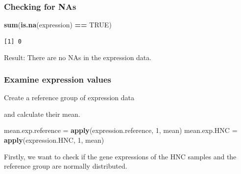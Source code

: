 \documentclass[]{article}
\newenvironment{Shaded}{\begin{snugshade}}{\end{snugshade}}
\newcommand{\KeywordTok}[1]{\textcolor[rgb]{0.13,0.29,0.53}{\textbf{#1}}}
\newcommand{\DecValTok}[1]{\textcolor[rgb]{0.00,0.00,0.81}{#1}}
\newcommand{\StringTok}[1]{\textcolor[rgb]{0.31,0.60,0.02}{#1}}
\newcommand{\CommentTok}[1]{\textcolor[rgb]{0.56,0.35,0.01}{\textit{#1}}}
\newcommand{\OtherTok}[1]{\textcolor[rgb]{0.56,0.35,0.01}{#1}}
\newcommand{\ControlFlowTok}[1]{\textcolor[rgb]{0.13,0.29,0.53}{\textbf{#1}}}
\newcommand{\OperatorTok}[1]{\textcolor[rgb]{0.81,0.36,0.00}{\textbf{#1}}}
\newcommand{\NormalTok}[1]{#1}
\begin{document}
\subsubsection{Checking for NAs}\label{checking-for-nas}

\begin{Shaded}
\begin{Highlighting}[]
\KeywordTok{sum}\NormalTok{(}\KeywordTok{is.na}\NormalTok{(expression) }\OperatorTok{==}\StringTok{ }\OtherTok{TRUE}\NormalTok{)}
\end{Highlighting}
\end{Shaded}

\begin{verbatim}
[1] 0
\end{verbatim}

Result: There are no NAs in the expression data.

\subsubsection{Examine expression
values}\label{examine-expression-values}

Create a reference group of expression data

\begin{Shaded}
\end{Shaded}

and calculate their mean.

\begin{Shaded}
\begin{Highlighting}[]
\NormalTok{mean.exp.reference =}\StringTok{ }\KeywordTok{apply}\NormalTok{(expression.reference, }\DecValTok{1}\NormalTok{, mean)}
\NormalTok{mean.exp.HNC =}\StringTok{ }\KeywordTok{apply}\NormalTok{(expression.HNC, }\DecValTok{1}\NormalTok{, mean)}
\end{Highlighting}
\end{Shaded}

Firstly, we want to check if the gene expressions of the HNC samples and
the reference group are normally distributed.
\end{document}
